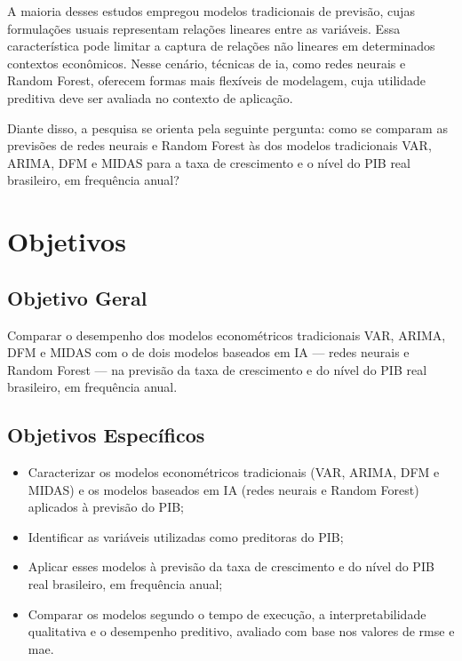 A maioria desses estudos empregou modelos tradicionais de previsão, cujas formulações usuais representam relações lineares entre as variáveis. Essa característica pode limitar a captura de relações não lineares em determinados contextos econômicos. Nesse cenário, técnicas de \ac{ia}, como redes neurais e Random Forest, oferecem formas mais flexíveis de modelagem, cuja utilidade preditiva deve ser avaliada no contexto de aplicação.

Diante disso, a pesquisa se orienta pela seguinte pergunta: como se comparam as previsões de redes neurais e Random Forest às dos modelos tradicionais VAR, ARIMA, DFM e MIDAS para a taxa de crescimento e o nível do PIB real brasileiro, em frequência anual?



\section{Objetivos}
\subsection{Objetivo Geral}
Comparar o desempenho dos modelos econométricos tradicionais VAR, ARIMA, DFM e MIDAS com o de dois modelos baseados em IA — redes neurais e Random Forest — na previsão da taxa de crescimento e do nível do PIB real brasileiro, em frequência anual.


\subsection{Objetivos Específicos}
\begin{itemize}
	\item[a)] Caracterizar os modelos econométricos tradicionais (VAR, ARIMA, DFM e MIDAS) e os modelos baseados em IA (redes neurais e Random Forest) aplicados à previsão do PIB;
	\item[b)] Identificar as variáveis utilizadas como preditoras do PIB;
	\item[c)] Aplicar esses modelos à previsão da taxa de crescimento e do nível do PIB real brasileiro, em frequência anual;
	\item[d)] Comparar os modelos segundo o tempo de execução, a interpretabilidade qualitativa e o desempenho preditivo, avaliado com base nos valores de \ac{rmse} e \ac{mae}.
\end{itemize}



